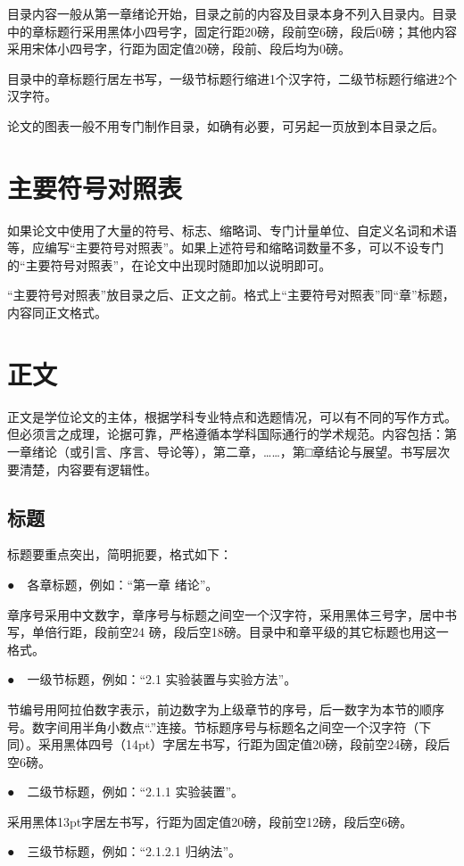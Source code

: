 目录内容一般从第一章绪论开始，目录之前的内容及目录本身不列入目录内。目录中的章标题行采用黑体小四号字，固定行距20磅，段前空6磅，段后0磅；其他内容采用宋体小四号字，行距为固定值20磅，段前、段后均为0磅。

目录中的章标题行居左书写，一级节标题行缩进1个汉字符，二级节标题行缩进2个汉字符。

论文的图表一般不用专门制作目录，如确有必要，可另起一页放到本目录之后。

\section{主要符号对照表}	
如果论文中使用了大量的符号、标志、缩略词、专门计量单位、自定义名词和术语等，应编写“主要符号对照表”。如果上述符号和缩略词数量不多，可以不设专门的“主要符号对照表”，在论文中出现时随即加以说明即可。

“主要符号对照表”放目录之后、正文之前。格式上“主要符号对照表”同“章”标题，内容同正文格式。

\section{正文}
正文是学位论文的主体，根据学科专业特点和选题情况，可以有不同的写作方式。但必须言之成理，论据可靠，严格遵循本学科国际通行的学术规范。内容包括：第一章绪论（或引言、序言、导论等），第二章，……，第□章结论与展望。书写层次要清楚，内容要有逻辑性。

\subsection{标题}
标题要重点突出，简明扼要，格式如下：

●　各章标题，例如：“第一章  绪论”。

章序号采用中文数字，章序号与标题之间空一个汉字符，采用黑体三号字，居中书写，单倍行距，段前空24 磅，段后空18磅。目录中和章平级的其它标题也用这一格式。

●　一级节标题，例如：“2.1  实验装置与实验方法”。

节编号用阿拉伯数字表示，前边数字为上级章节的序号，后一数字为本节的顺序号。数字间用半角小数点“.”连接。节标题序号与标题名之间空一个汉字符（下同）。采用黑体四号（14pt）字居左书写，行距为固定值20磅，段前空24磅，段后空6磅。

●　二级节标题，例如：“2.1.1  实验装置”。

采用黑体13pt字居左书写，行距为固定值20磅，段前空12磅，段后空6磅。

●　三级节标题，例如：“2.1.2.1  归纳法”。

